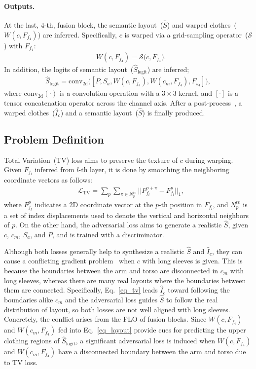 \documentclass[letterpaper]{article} %
\begin{document}
\paragraph{Outputs.} At the last, $4$-th, fusion block, the semantic layout~($\hat{S}$) and warped clothes~($W(c,F_{f_{4}})$) are inferred. Specifically, $c$ is warped via a grid-sampling operator~($\mathcal{S}$) with $F_{f_{4}}$:
\begin{eqnarray}
     & W(c,F_{f_{4}}) = \mathcal{S}\big(c, F_{f_{4}} \big).
\end{eqnarray}
In addition, the logits of semantic layout~($\hat{S}_{\text{logit}}$) are inferred;
\begin{eqnarray}
    \hat{S}_{\text{logit}} = \text{conv}_{\text{2d}}\big( [ P, S_a, W(c,F_{f_{4}}), W(c_m,F_{f_{4}}), F_{s_4} ] \big),
    \label{eq_layout}
\end{eqnarray}
where $\text{conv}_{\text{2d}}(\cdot)$ is a convolution operation with a $3\times 3$ kernel, and $[\cdot]$ is a tensor concatenation operator across the channel axis. After a post-process~\cite{lee2022hrviton}, a warped clothes~($\hat{I}_c$) and a semantic layout~($\hat{S}$) is finally produced.

\subsection{Problem Definition}
Total Variation~(TV) loss aims to preserve the texture of $c$ during warping.
Given $F_{f_l}$ inferred from $l$-th layer, it is done by smoothing the neighboring coordinate vectors as follows:
\begin{eqnarray}
    & \mathcal{L}_{\text{TV}} = \sum\limits_{p} \sum\limits_{\pi \in N_p^{tv}} ||F_{f_l}^{p+\pi} - F_{f_l}^p ||_1 ,
    \label{eq_tv}
\end{eqnarray}
where $F_{f_l}^p$ indicates a 2D coordinate vector at the $p$-th position in $F_{f_l}$, and $N_p^{tv}$ is a set of index displacements used to denote the vertical and horizontal neighbors of $p$.
On the other hand, the adversarial loss aims to generate a realistic $\hat{S}$, given $c$, $c_m$, $S_a$, and $P$, and is trained with a discriminator.

Although both losses generally help to synthesize a realistic $\hat{S}$ and $\hat{I}_c$, they can cause a conflicting gradient problem~\cite{shi2023recon} when $c$ with long sleeves is given. This is because the boundaries between the arm and torso are disconnected in $c_m$ with long sleeves, whereas there are many real layouts where the boundaries between them are connected.
Specifically, Eq.~\ref{eq_tv} leads $\hat{I}_c$ toward following the boundaries alike $c_m$ and the adversarial loss guides $\hat{S}$ to follow the real distribution of layout, so both losses are not well aligned with long sleeves.
Concretely, the conflict arises from the FLO of fusion blocks.
Since $W(c,F_{f_4})$ and $W(c_m,F_{f_4})$ fed into Eq.~\ref{eq_layout} provide cues for predicting the upper clothing regions of $\hat{S}_{\text{logit}}$, a significant adversarial loss is induced when $W(c,F_{f_4})$ and $W(c_m,F_{f_4})$ have a disconnected boundary between the arm and torso due to TV loss.
\end{document}
